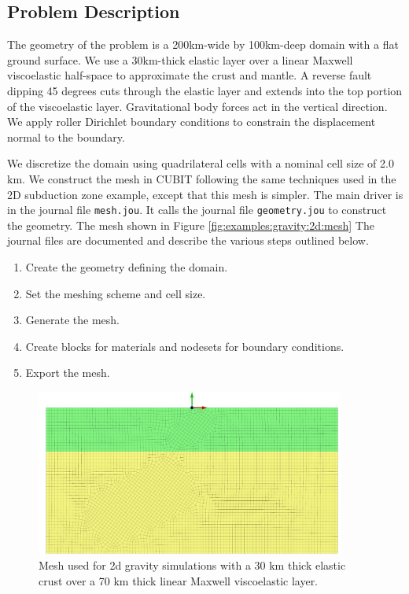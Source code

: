 \subsection{Problem Description}

The geometry of the problem is a 200km-wide by 100km-deep domain with
a flat ground surface. We use a 30km-thick elastic layer over a linear
Maxwell viscoelastic half-space to approximate the crust and mantle.
A reverse fault dipping 45 degrees cuts through the elastic layer
and extends into the top portion of the viscoelastic layer. Gravitational
body forces act in the vertical direction. We apply roller Dirichlet
boundary conditions to constrain the displacement normal to the boundary.

We discretize the domain using quadrilateral cells with a nominal
cell size of 2.0 km. We construct the mesh in CUBIT following the
same techniques used in the 2D subduction zone example, except that
this mesh is simpler. The main driver is in the journal file \texttt{mesh.jou}.
It calls the journal file \texttt{geometry.jou} to construct the geometry.
The mesh shown in Figure \vref{fig:examples:gravity:2d:mesh} The journal
files are documented and describe the various steps outlined below.
\begin{enumerate}
\item Create the geometry defining the domain.
\item Set the meshing scheme and cell size.
\item Generate the mesh.
\item Create blocks for materials and nodesets for boundary conditions.
\item Export the mesh.
\end{enumerate}
\begin{figure}
\begin{centering}
\includegraphics[width=4in]{tutorials/grav2d/figs/mesh}
\par\end{centering}

\caption{Mesh used for 2d gravity simulations with a 30 km thick elastic crust
over a 70 km thick linear Maxwell viscoelastic layer.\label{fig:examples:gravity:2d:mesh}}
\end{figure}



